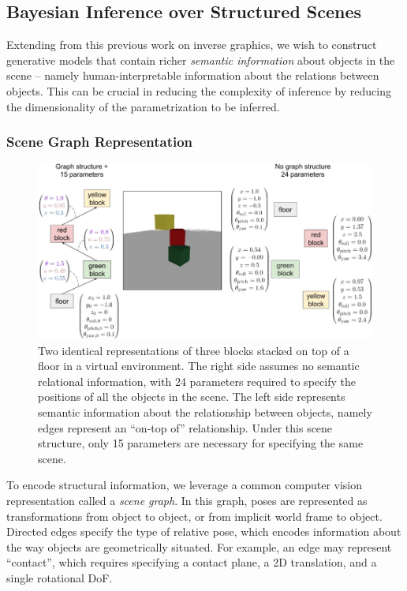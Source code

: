   \subsection{Bayesian Inference over Structured Scenes} \label{section:1.2.3}

    Extending from this previous work on inverse graphics, we wish to construct
    generative models that contain richer \textit{semantic information} about
    objects in the scene -- namely human-interpretable information about the
    relations between objects. This can be crucial in reducing the complexity
    of inference by reducing the dimensionality of the parametrization to be
    inferred.

    \subsubsection{Scene Graph Representation}

      \begin{figure}
        \centering
        \includegraphics[width=\textwidth]{figures/contact-graph.png}
        \caption{\small
          Two identical representations of three blocks stacked on top of a
          floor in a virtual environment. The right side assumes no semantic
          relational information, with 24 parameters required to specify the
          positions of all the objects in the scene. The left side represents
          semantic information about the relationship between objects, namely
          edges represent an ``on-top of'' relationship. Under this scene
          structure, only 15 parameters are necessary for specifying the same
          scene.\cite{zinberg2019scenegraphs}
        }
        \label{fig:contact-graph}
      \end{figure}

      To encode structural information, we leverage a common computer vision
      representation called a \textit{scene graph}. In this graph, poses are
      represented as transformations from object to object, or from implicit
      world frame to object. Directed edges specify the type of relative pose,
      which encodes information about the way objects are geometrically
      situated. For example, an edge may represent ``contact'', which requires
      specifying a contact plane, a 2D translation, and a single rotational
      DoF.

